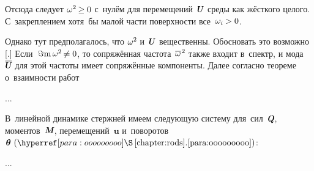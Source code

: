 \begin{otherlanguage}{russian}
\vspace{-0.2em} \noindent Отсюда следует ${\omega^2 \hspace{-0.2ex} \geq 0}$ с~нулём для перемещений~$\mathboldU$ среды как жёсткого целого. С~закреплением хотя~бы малой части поверхности все~${\omega_i \hspace{-0.1ex} > 0}$.

Однако тут предполагалось, что ${\omega^2\hspace{-0.1ex}}$ и~$\mathboldU$ вещественны. Обосновать это возможно [.] Если~${\operatorname{{\Im}m} \omega^2 \hspace{-0.2ex} \neq 0}$, то сопряжённая частота~${\overline{\omega}^{\hspace{.2ex}2}\hspace{-0.2ex}}$ также входит в~спектр, и мода~${\overline{\mathboldU}\hspace{-0.1ex}}$ для этой частоты имеет сопряжённые компоненты. Далее согласно теореме о~взаимности работ

...




\end{otherlanguage}



\begin{otherlanguage}{russian}

В~линейной динамике стержней имеем следующую систему для~сил~$\mathboldQ$, моментов~$\mathboldM$, перемещений~$\bm{u}$ и~поворотов~$\bm{\theta}~(\chapdotpararef{chapter:rods}{para:ooooooooo})$:

...



\end{otherlanguage}



